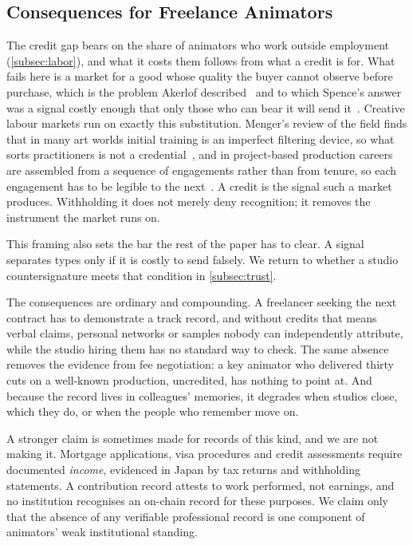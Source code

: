 \subsection{Consequences for Freelance Animators}
\label{subsec:consequences}

The credit gap bears on the share of animators who work outside employment
(\cref{subsec:labor}), and what it costs them follows from what a credit is for.
What fails here is a market for a good whose quality the buyer cannot observe
before purchase, which is the problem Akerlof
described~\cite{akerlof1970lemons} and to which Spence's answer was a signal
costly enough that only those who can bear it will send
it~\cite{spence1973signaling}. Creative labour markets run on exactly this
substitution. Menger's review of the field finds that in many art worlds initial
training is an imperfect filtering device, so what sorts practitioners is not a
credential~\cite{menger1999artistic}, and in project-based production careers are
assembled from a sequence of engagements rather than from tenure, so each
engagement has to be legible to the next~\cite{faulkner1987projects}. A credit is
the signal such a market produces. Withholding it does not merely deny
recognition; it removes the instrument the market runs on.

This framing also sets the bar the rest of the paper has to clear. A signal
separates types only if it is costly to send falsely. We return to whether a
studio countersignature meets that condition in \cref{subsec:trust}.

The consequences are ordinary and compounding. A freelancer seeking the next contract has
to demonstrate a track record, and without credits that means verbal claims, personal
networks or samples nobody can independently attribute, while the studio hiring them has
no standard way to check. The same absence removes the evidence from fee negotiation: a
key animator who delivered thirty cuts on a well-known production, uncredited, has nothing
to point at. And because the record lives in colleagues' memories, it degrades when
studios close, which they do, or when the people who remember move on.

A stronger claim is sometimes made for records of this kind, and we are not making it.
Mortgage applications, visa procedures and credit assessments require documented
\emph{income}, evidenced in Japan by tax returns and withholding statements. A
contribution record attests to work performed, not earnings, and no institution recognises
an on-chain record for these purposes. We claim only that the absence of any verifiable
professional record is one component of animators' weak institutional standing.


